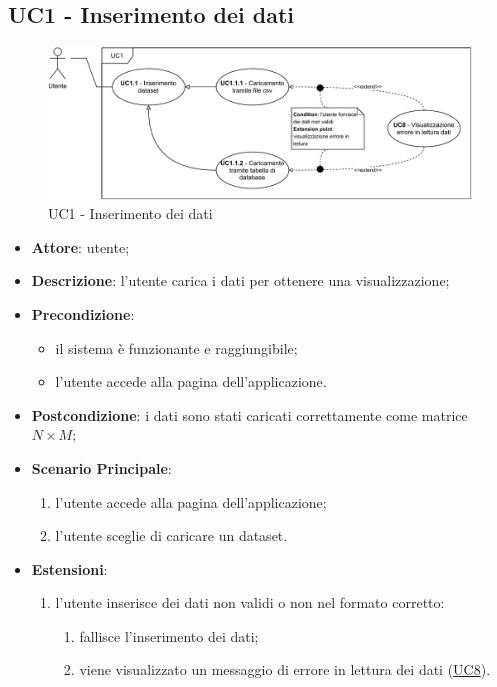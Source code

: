 \subsection{UC1 - Inserimento dei dati }
\label{uc1}

    \begin{figure}[htbp]
        \centering
        \includegraphics[width=1.0\textwidth]{source/sections/casi-uso/diagrams/uc1.pdf}
        \caption{UC1 - Inserimento dei dati}
    \end{figure}
    
    \begin{itemize}
    \item \textbf{Attore}: utente;
    \item \textbf{Descrizione}: l'utente carica i dati per ottenere una visualizzazione;
    \item \textbf{Precondizione}:
    \begin{itemize}
        \item il sistema è funzionante e raggiungibile;
        \item l'utente accede alla pagina dell'applicazione.
    \end{itemize}
    \item \textbf{Postcondizione}: i dati sono stati caricati correttamente come matrice $N\times M$;
    \item \textbf{Scenario Principale}: 
        \begin{enumerate}
            \item l'utente accede alla pagina dell'applicazione;
            \item l'utente sceglie di caricare un dataset.
        \end{enumerate}  
    \item \textbf{Estensioni}:
        \begin{enumerate}
            \item l'utente inserisce dei dati non validi o non nel formato corretto:
                \begin{enumerate}
                    \item fallisce l'inserimento dei dati;
                    \item viene visualizzato un messaggio di errore in lettura dei dati (\hyperref[uc8]{UC8}).
                \end{enumerate}
        \end{enumerate}
    \end{itemize}
    
